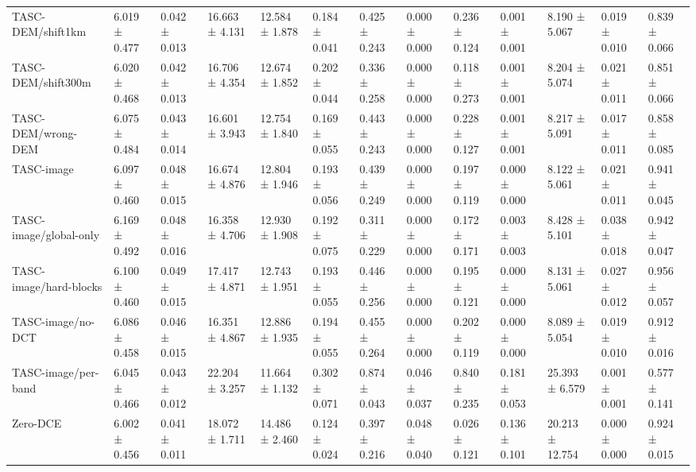 \begin{table}[t]
\begin{tabular}{lllllllllllll}
TASC-DEM/shift1km & 6.019 ± 0.477 & 0.042 ± 0.013 & 16.663 ± 4.131 & 12.584 ± 1.878 & 0.184 ± 0.041 & 0.425 ± 0.243 & 0.000 ± 0.000 & 0.236 ± 0.124 & 0.001 ± 0.001 & 8.190 ± 5.067 & 0.019 ± 0.010 & 0.839 ± 0.066 \\
TASC-DEM/shift300m & 6.020 ± 0.468 & 0.042 ± 0.013 & 16.706 ± 4.354 & 12.674 ± 1.852 & 0.202 ± 0.044 & 0.336 ± 0.258 & 0.000 ± 0.000 & 0.118 ± 0.273 & 0.001 ± 0.001 & 8.204 ± 5.074 & 0.021 ± 0.011 & 0.851 ± 0.066 \\
TASC-DEM/wrong-DEM & 6.075 ± 0.484 & 0.043 ± 0.014 & 16.601 ± 3.943 & 12.754 ± 1.840 & 0.169 ± 0.055 & 0.443 ± 0.243 & 0.000 ± 0.000 & 0.228 ± 0.127 & 0.001 ± 0.001 & 8.217 ± 5.091 & 0.017 ± 0.011 & 0.858 ± 0.085 \\
TASC-image & 6.097 ± 0.460 & 0.048 ± 0.015 & 16.674 ± 4.876 & 12.804 ± 1.946 & 0.193 ± 0.056 & 0.439 ± 0.249 & 0.000 ± 0.000 & 0.197 ± 0.119 & 0.000 ± 0.000 & 8.122 ± 5.061 & 0.021 ± 0.011 & 0.941 ± 0.045 \\
TASC-image/global-only & 6.169 ± 0.492 & 0.048 ± 0.016 & 16.358 ± 4.706 & 12.930 ± 1.908 & 0.192 ± 0.075 & 0.311 ± 0.229 & 0.000 ± 0.000 & 0.172 ± 0.171 & 0.003 ± 0.003 & 8.428 ± 5.101 & 0.038 ± 0.018 & 0.942 ± 0.047 \\
TASC-image/hard-blocks & 6.100 ± 0.460 & 0.049 ± 0.015 & 17.417 ± 4.871 & 12.743 ± 1.951 & 0.193 ± 0.055 & 0.446 ± 0.256 & 0.000 ± 0.000 & 0.195 ± 0.121 & 0.000 ± 0.000 & 8.131 ± 5.061 & 0.027 ± 0.012 & 0.956 ± 0.057 \\
TASC-image/no-DCT & 6.086 ± 0.458 & 0.046 ± 0.015 & 16.351 ± 4.867 & 12.886 ± 1.935 & 0.194 ± 0.055 & 0.455 ± 0.264 & 0.000 ± 0.000 & 0.202 ± 0.119 & 0.000 ± 0.000 & 8.089 ± 5.054 & 0.019 ± 0.010 & 0.912 ± 0.016 \\
TASC-image/per-band & 6.045 ± 0.466 & 0.043 ± 0.012 & 22.204 ± 3.257 & 11.664 ± 1.132 & 0.302 ± 0.071 & 0.874 ± 0.043 & 0.046 ± 0.037 & 0.840 ± 0.235 & 0.181 ± 0.053 & 25.393 ± 6.579 & 0.001 ± 0.001 & 0.577 ± 0.141 \\
Zero-DCE & 6.002 ± 0.456 & 0.041 ± 0.011 & 18.072 ± 1.711 & 14.486 ± 2.460 & 0.124 ± 0.024 & 0.397 ± 0.216 & 0.048 ± 0.040 & 0.026 ± 0.121 & 0.136 ± 0.101 & 20.213 ± 12.754 & 0.000 ± 0.000 & 0.924 ± 0.015 \\
\bottomrule
\end{tabular}
\end{table}
